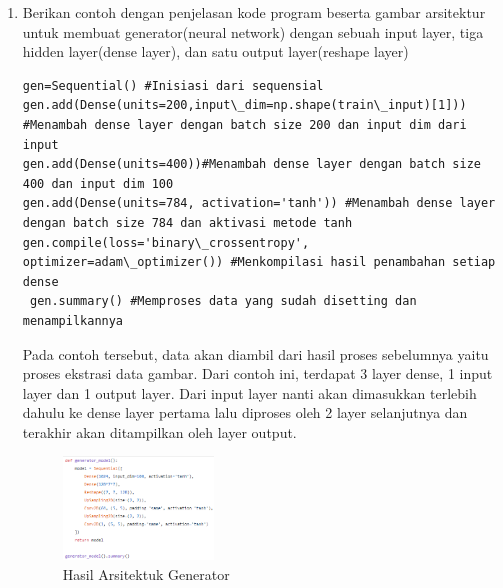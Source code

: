 \begin{enumerate}
            \item Berikan contoh dengan penjelasan kode program beserta gambar arsitektur untuk membuat generator(neural network) dengan sebuah input layer, tiga hidden layer(dense layer), dan satu output layer(reshape layer)
\begin{verbatim}
gen=Sequential() #Inisiasi dari sequensial
gen.add(Dense(units=200,input\_dim=np.shape(train\_input)[1])) #Menambah dense layer dengan batch size 200 dan input dim dari input
gen.add(Dense(units=400))#Menambah dense layer dengan batch size 400 dan input dim 100
gen.add(Dense(units=784, activation='tanh')) #Menambah dense layer dengan batch size 784 dan aktivasi metode tanh
gen.compile(loss='binary\_crossentropy', optimizer=adam\_optimizer()) #Menkompilasi hasil penambahan setiap dense
 gen.summary() #Memproses data yang sudah disetting dan menampilkannya
\end{verbatim}    
            \par Pada contoh tersebut, data akan diambil dari hasil proses sebelumnya yaitu proses ekstrasi data gambar. Dari contoh ini, terdapat 3 layer dense, 1 input layer dan 1 output layer. Dari input layer nanti akan dimasukkan terlebih dahulu ke dense layer pertama lalu diproses oleh 2 layer selanjutnya dan terakhir akan ditampilkan oleh layer output.
            \begin{figure}[H]
                \includegraphics[width=4cm]{figures/1174095/chapter8/teori9.PNG}
                \centering
                  \caption{Hasil Arsitektuk Generator}
            \end{figure}


\end{enumerate}
